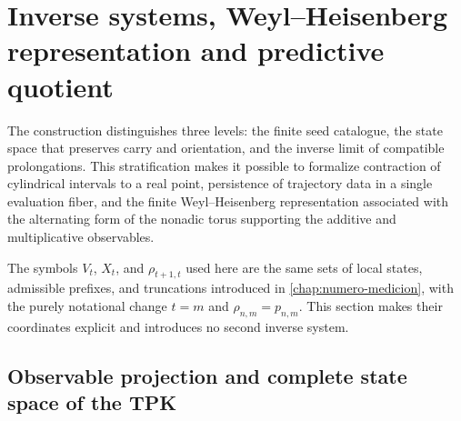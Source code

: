 \chapter{Inverse systems, Weyl--Heisenberg representation and predictive quotient}
\label{chap:numero-heisenberg-d108}

The construction distinguishes three levels: the finite seed catalogue, the
state space that preserves carry and orientation, and the inverse
limit of compatible prolongations. This stratification makes it possible to
formalize contraction of cylindrical intervals to a real point,
persistence of trajectory data in a single evaluation fiber, and
the finite Weyl--Heisenberg representation associated with the alternating form
of the nonadic torus supporting the additive and multiplicative observables.

The symbols \(V_t\), \(X_t\), and \(\rho_{t+1,t}\) used here are the
same sets of local states, admissible prefixes, and truncations
introduced in \cref{chap:numero-medicion}, with the purely
notational change \(t=m\) and \(\rho_{n,m}=p_{n,m}\). This section makes their
coordinates explicit and introduces no second inverse system.

\section{Observable projection and complete state space of the TPK}

